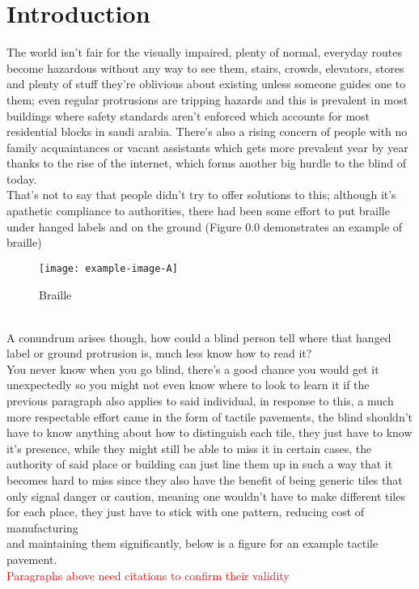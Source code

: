 \section{Introduction}
The world isn't fair for the visually impaired, plenty of normal, everyday routes become hazardous without any way to see them, stairs, crowds, elevators, stores and plenty of stuff they're oblivious about existing unless someone guides one to them; even regular protrusions are tripping hazards and this is prevalent in  most buildings where safety standards aren't enforced which accounts for most residential blocks in saudi arabia.
There's also a rising concern of people with no family acquaintances or vacant assistants which gets more prevalent year by year thanks to the rise of the internet, which forms another big hurdle to the blind of today.
\\That's not to say that people didn't try to offer solutions to this; although it's apathetic compliance to authorities, there had been some effort to put braille under hanged labels and on the ground (Figure 0.0 demonstrates an example of braille)
\begin{figure}[h] 
	\centering
	\texttt{[image: example-image-A]}
	\caption{Braille}
	\label{braille}
\end{figure}
\\A conundrum arises though, how could a blind person tell where that hanged label or ground protrusion is, much less know how to read it? 
\\You never know when you go blind, there's a good chance you would get it unexpectedly so you might not even know where to look to learn it if the previous paragraph also applies to said individual, in response to this, a much more respectable effort came in the form of tactile pavements, the blind shouldn't have to know anything about how to distinguish each tile, they just have to know it's presence, while they might still be able to miss it in certain cases, the authority of said place or building can just line them up in such a way that it becomes hard to miss since they also have the benefit of being generic tiles that only signal danger or caution, meaning one wouldn't have to make different tiles for each place, they just have to stick with one pattern, reducing cost of manufacturing \\and maintaining them significantly, below is a figure for an example tactile pavement.
\\  \textcolor{red} {Paragraphs above need citations to confirm their validity}
